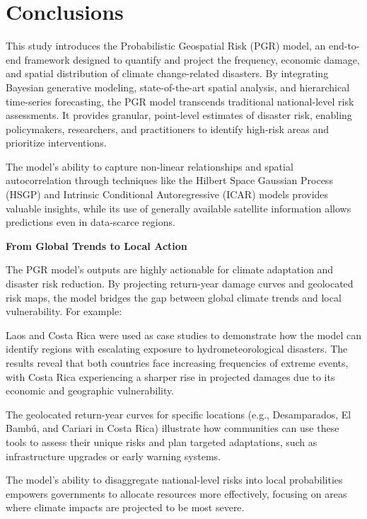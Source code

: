 
\section{Conclusions}
\label{sec:conclusions}

This study introduces the Probabilistic Geospatial Risk (PGR) model, an end-to-end framework designed to quantify and project the frequency, economic damage, and spatial distribution of climate change-related disasters. By integrating Bayesian generative modeling, state-of-the-art spatial analysis, and hierarchical time-series forecasting, the PGR model transcends traditional national-level risk assessments. It provides granular, point-level estimates of disaster risk, enabling policymakers, researchers, and practitioners to identify high-risk areas and prioritize interventions.

The model's ability to capture non-linear relationships and spatial autocorrelation through techniques like the Hilbert Space Gaussian Process (HSGP) and Intrinsic Conditional Autoregressive (ICAR) models provides valuable insights, while its use of generally available satellite information allows predictions even in data-scarce regions.

\textbf{From Global Trends to Local Action}

The PGR model's outputs are highly actionable for climate adaptation and disaster risk reduction. By projecting return-year damage curves and geolocated risk maps, the model bridges the gap between global climate trends and local vulnerability. For example:

Laos and Costa Rica were used as case studies to demonstrate how the model can identify regions with escalating exposure to hydrometeorological disasters. The results reveal that both countries face increasing frequencies of extreme events, with Costa Rica experiencing a sharper rise in projected damages due to its economic and geographic vulnerability.

The geolocated return-year curves for specific locations (e.g., Desamparados, El Bamb\'{u}, and Cariari in Costa Rica) illustrate how communities can use these tools to assess their unique risks and plan targeted adaptations, such as infrastructure upgrades or early warning systems.

The model's ability to disaggregate national-level risks into local probabilities empowers governments to allocate resources more effectively, focusing on areas where climate impacts are projected to be most severe.

